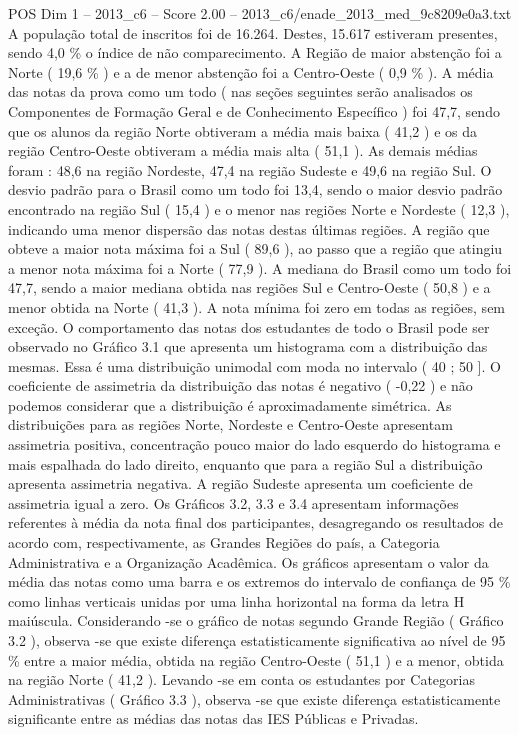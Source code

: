 \begin{textsample}{POS Dim 1 – 2013\_c6 – Score 2.00 – 2013\_c6/enade\_2013\_med\_9c8209e0a3.txt}
A população total de inscritos foi de 16.264.
Destes, 15.617 estiveram presentes, sendo 4,0 \% o índice de não comparecimento.
A Região de maior abstenção foi a Norte ( 19,6 \% ) e a de menor abstenção foi a Centro-Oeste ( 0,9 \% ).
A média das notas da prova como um todo ( nas seções seguintes serão analisados os Componentes de Formação Geral e de Conhecimento Específico ) foi 47,7, sendo que os alunos da região Norte obtiveram a média mais baixa ( 41,2 ) e os da região Centro-Oeste obtiveram a média mais alta ( 51,1 ).
As demais médias foram : 48,6 na região Nordeste, 47,4 na região Sudeste e 49,6 na região Sul.
O desvio padrão para o Brasil como um todo foi 13,4, sendo o maior desvio padrão encontrado na região Sul ( 15,4 ) e o menor nas regiões Norte e Nordeste ( 12,3 ), indicando uma menor dispersão das notas destas últimas regiões.
A região que obteve a maior nota máxima foi a Sul ( 89,6 ), ao passo que a região que atingiu a menor nota máxima foi a Norte ( 77,9 ).
A mediana do Brasil como um todo foi 47,7, sendo a maior mediana obtida nas regiões Sul e Centro-Oeste ( 50,8 ) e a menor obtida na Norte ( 41,3 ).
A nota mínima foi zero em todas as regiões, sem exceção.
O comportamento das notas dos estudantes de todo o Brasil pode ser observado no Gráfico 3.1 que apresenta um histograma com a distribuição das mesmas.
Essa é uma distribuição unimodal com moda no intervalo ( 40 ; 50 ].
O coeficiente de assimetria da distribuição das notas é negativo ( -0,22 ) e não podemos considerar que a distribuição é aproximadamente simétrica.
As distribuições para as regiões Norte, Nordeste e Centro-Oeste apresentam assimetria positiva, concentração pouco maior do lado esquerdo do histograma e mais espalhada do lado direito, enquanto que para a região Sul a distribuição apresenta assimetria negativa.
A região Sudeste apresenta um coeficiente de assimetria igual a zero.
Os Gráficos 3.2, 3.3 e 3.4 apresentam informações referentes à média da nota final dos participantes, desagregando os resultados de acordo com, respectivamente, as Grandes Regiões do país, a Categoria Administrativa e a Organização Acadêmica.
Os gráficos apresentam o valor da média das notas como uma barra e os extremos do intervalo de confiança de 95 \% como linhas verticais unidas por uma linha horizontal na forma da letra H maiúscula.
Considerando -se o gráfico de notas segundo Grande Região ( Gráfico 3.2 ), observa -se que existe diferença estatisticamente significativa ao nível de 95 \% entre a maior média, obtida na região Centro-Oeste ( 51,1 ) e a menor, obtida na região Norte ( 41,2 ).
Levando -se em conta os estudantes por Categorias Administrativas ( Gráfico 3.3 ), observa -se que existe diferença estatisticamente significante entre as médias das notas das IES Públicas e Privadas.

\end{textsample}
